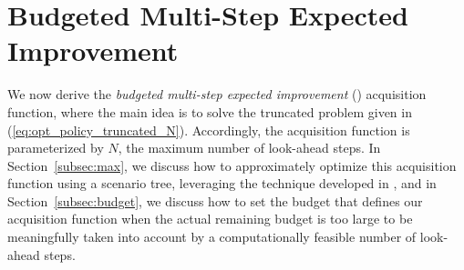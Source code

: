 
\section{Budgeted Multi-Step Expected Improvement}
\label{sec:acqf}
 We now derive the \emph{budgeted multi-step expected improvement} (\BMSEI{}) acquisition function, where
the main idea is to solve the truncated problem given in (\ref{eq:opt_policy_truncated_N}). Accordingly, the acquisition function is parameterized by $N$, the maximum number of look-ahead steps. In Section~\ref{subsec:max}, we discuss how to approximately optimize this acquisition function using a scenario tree, leveraging the technique developed in \cite{jiang2020efficient}, and in Section~\ref{subsec:budget}, we discuss how to set the budget that defines our acquisition function when the actual remaining budget is too large to be meaningfully taken into account by a computationally feasible number of look-ahead steps. 






